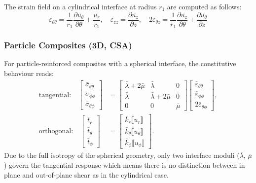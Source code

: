 \documentclass[oneside, 12pt, a4paper, bibliography=totoc]{book}
\newcommand{\jump}[1]{\llbracket #1 \rrbracket}    %
\begin{document}
The strain field on a cylindrical interface at radius $r_1$ are computed as follows:
%
\begin{equation}
    \bar{\varepsilon}_{\theta\theta} = \frac{1}{r_1}\frac{\partial \bar{u_\theta}}{\partial \theta} + \frac{\bar{u_r}}{r_1}, \quad
    \bar{\varepsilon}_{zz} = \frac{\partial \bar{u_z}}{\partial z}, \quad
    2\bar{\varepsilon}_{\theta z} = \frac{1}{r_1}\frac{\partial \bar{u_z}}{\partial \theta} + \frac{\partial \bar{u_\theta}}{\partial z}
    \label{eq:surface_strains}
\end{equation}

\subsubsection{Particle Composites (3D, CSA)}

For particle-reinforced composites with a spherical interface, the constitutive behaviour reads:
%
\begin{equation}
\begin{aligned}
\text{tangential:}\quad
\begin{bmatrix}
\bar{\sigma}_{\theta\theta} \\
\bar{\sigma}_{\phi\phi} \\
\bar{\sigma}_{\theta\phi}
\end{bmatrix}
&=
\begin{bmatrix}
\bar{\lambda} + 2\bar{\mu} & \bar{\lambda} & 0 \\
\bar{\lambda} & \bar{\lambda} + 2\bar{\mu} & 0 \\
0 & 0 & \bar{\mu}
\end{bmatrix}
\begin{bmatrix}
\bar{\varepsilon}_{\theta\theta} \\
\bar{\varepsilon}_{\phi\phi} \\
2\bar{\varepsilon}_{\theta\phi}
\end{bmatrix},
\\[10pt]
\text{orthogonal:}\quad
\begin{bmatrix}
\bar{t}_r \\
\bar{t}_\theta \\
\bar{t}_\phi
\end{bmatrix}
&=
\begin{bmatrix}
\bar{k}_r \jump{u_r}\ \\
\bar{k}_\theta \jump{u_\theta} \\
\bar{k}_\phi \jump{u_\phi}
\end{bmatrix}.
\end{aligned}\label{eq:interface_spherical}
\end{equation}
%
Due to the full isotropy of the spherical geometry, only two interface moduli ($\bar{\lambda}$, $\bar{\mu}$) govern the tangential response which means there is no distinction between in-plane and out-of-plane shear as in the cylindrical case.
\end{document}
